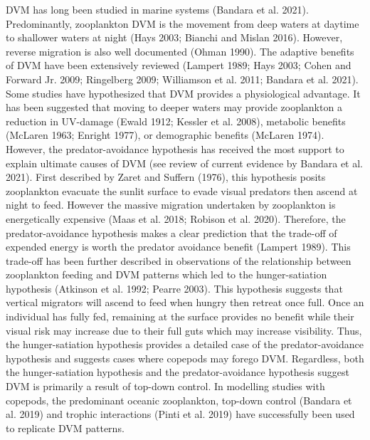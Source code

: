 \documentclass[
]{article}
\begin{document}
DVM has long been studied in marine systems (Bandara et al. 2021).
Predominantly, zooplankton DVM is the movement from deep waters at
daytime to shallower waters at night (Hays 2003; Bianchi and Mislan
2016). However, reverse migration is also well documented (Ohman 1990).
The adaptive benefits of DVM have been extensively reviewed (Lampert
1989; Hays 2003; Cohen and Forward Jr. 2009; Ringelberg 2009; Williamson
et al. 2011; Bandara et al. 2021). Some studies have hypothesized that
DVM provides a physiological advantage. It has been suggested that
moving to deeper waters may provide zooplankton a reduction in UV-damage
(Ewald 1912; Kessler et al. 2008), metabolic benefits (McLaren 1963;
Enright 1977), or demographic benefits (McLaren 1974). However, the
predator-avoidance hypothesis has received the most support to explain
ultimate causes of DVM (see review of current evidence by Bandara et al.
2021). First described by Zaret and Suffern (1976), this hypothesis
posits zooplankton evacuate the sunlit surface to evade visual predators
then ascend at night to feed. However the massive migration undertaken
by zooplankton is energetically expensive (Maas et al. 2018; Robison et
al. 2020). Therefore, the predator-avoidance hypothesis makes a clear
prediction that the trade-off of expended energy is worth the predator
avoidance benefit (Lampert 1989). This trade-off has been further
described in observations of the relationship between zooplankton
feeding and DVM patterns which led to the hunger-satiation hypothesis
(Atkinson et al. 1992; Pearre 2003). This hypothesis suggests that
vertical migrators will ascend to feed when hungry then retreat once
full. Once an individual has fully fed, remaining at the surface
provides no benefit while their visual risk may increase due to their
full guts which may increase visibility. Thus, the hunger-satiation
hypothesis provides a detailed case of the predator-avoidance hypothesis
and suggests cases where copepods may forego DVM. Regardless, both the
hunger-satiation hypothesis and the predator-avoidance hypothesis
suggest DVM is primarily a result of top-down control. In modelling
studies with copepods, the predominant oceanic zooplankton, top-down
control (Bandara et al. 2019) and trophic interactions (Pinti et al.
2019) have successfully been used to replicate DVM patterns.
\end{document}
